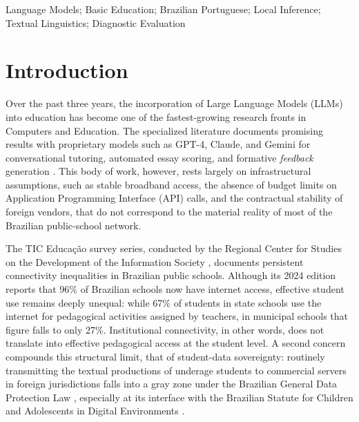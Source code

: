 \documentclass{sbc2023}%
\begin{document}
\begin{frontmatter}
\begin{abstract}
\end{abstract}

\begin{keywords}
Language Models; Basic Education; Brazilian Portuguese; Local Inference; Textual Linguistics; Diagnostic Evaluation
\end{keywords}

\end{frontmatter}


\section{Introduction}
\label{sec:intro}

Over the past three years, the incorporation of Large Language Models (LLMs) into education has become one of the fastest-growing research fronts in Computers and Education. The specialized literature documents promising results with proprietary models such as GPT-4, Claude, and Gemini for conversational tutoring, automated essay scoring, and formative \textit{feedback} generation \citep{kasneci2023chatgpt,tlili2023devil}. This body of work, however, rests largely on infrastructural assumptions, such as stable broadband access, the absence of budget limits on Application Programming Interface (API) calls, and the contractual stability of foreign vendors, that do not correspond to the material reality of most of the Brazilian public-school network.

The TIC Educação survey series, conducted by the Regional Center for Studies on the Development of the Information Society \citep{cgibr2025tic}, documents persistent connectivity inequalities in Brazilian public schools. Although its 2024 edition reports that 96\% of Brazilian schools now have internet access, effective student use remains deeply unequal: while 67\% of students in state schools use the internet for pedagogical activities assigned by teachers, in municipal schools that figure falls to only 27\%. Institutional connectivity, in other words, does not translate into effective pedagogical access at the student level. A second concern compounds this structural limit, that of student-data sovereignty: routinely transmitting the textual productions of underage students to commercial servers in foreign jurisdictions falls into a gray zone under the Brazilian General Data Protection Law \citep{brasil2018lgpd}, especially at its interface with the Brazilian Statute for Children and Adolescents in Digital Environments \citep{brasil2025eca}.
\end{document}
